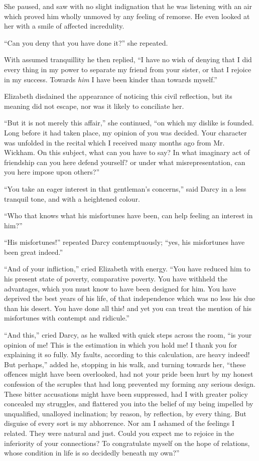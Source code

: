 She paused, and saw with no slight indignation that
he was listening with an air which proved him wholly
unmoved by any feeling of remorse. He even looked at
her with a smile of affected incredulity.

“Can you deny that you have done it?” she repeated.

With assumed tranquillity he then replied, “I have no wish
of denying that I did every thing in my power to separate
my friend from your sister, or that I rejoice in my success.
Towards \textit{him} I have been kinder than towards myself.”

Elizabeth disdained the appearance of noticing this civil
reflection, but its meaning did not escape, nor was it
likely to conciliate her.

“But it is not merely this affair,” she continued, “on
which my dislike is founded. Long before it had taken
place, my opinion of you was decided. Your character
was unfolded in the recital which I received many months
ago from Mr. Wickham. On this subject, what can you
have to say? In what imaginary act of friendship can you
here defend yourself? or under what misrepresentation,
can you here impose upon others?”

“You take an eager interest in that gentleman’s
concerns,” said Darcy in a less tranquil tone, and with
a heightened colour.

“Who that knows what his misfortunes have been, can
help feeling an interest in him?”

“His misfortunes!” repeated Darcy contemptuously;
“yes, his misfortunes have been great indeed.”

“And of your infliction,” cried Elizabeth with energy.
“You have reduced him to his present state of poverty,
comparative poverty. You have withheld the advantages,
which you must know to have been designed for him.
You have deprived the best years of his life, of that
independence which was no less his due than his desert. You
have done all this! and yet you can treat the mention
of his misfortunes with contempt and ridicule.”

“And this,” cried Darcy, as he walked with quick
steps across the room, “is your opinion of me! This is
the estimation in which you hold me! I thank you
for explaining it so fully. My faults, according to this
calculation, are heavy indeed! But perhaps,” added he,
stopping in his walk, and turning towards her, “these
offences might have been overlooked, had not your pride
been hurt by my honest confession of the scruples that
had long prevented my forming any serious design.
These bitter accusations might have been suppressed, had
I with greater policy concealed my struggles, and flattered
you into the belief of my being impelled by unqualified,
unalloyed inclination; by reason, by reflection, by
every thing. But disguise of every sort is my abhorrence.
Nor am I ashamed of the feelings I related. They
were natural and just. Could you expect me to rejoice
in the inferiority of your connections? To congratulate
myself on the hope of relations, whose condition in life
is so decidedly beneath my own?”


